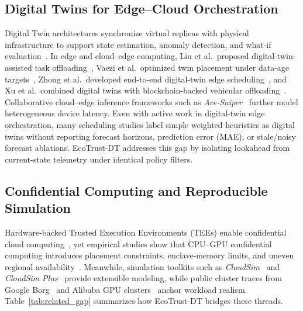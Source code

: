 \documentclass[conference]{IEEEtran}
\begin{document}
\subsection{Digital Twins for Edge--Cloud Orchestration}
Digital Twin architectures synchronize virtual replicas with physical infrastructure to support state estimation, anomaly detection, and what-if evaluation~\cite{tao2019dt,fuller2020dt,kritzinger2018dt}. In edge and cloud--edge computing, Liu et al.\ proposed digital-twin-assisted task offloading~\cite{liu2022dt}, Vaezi et al.\ optimized twin placement under data-age targets~\cite{vaezi2023dt}, Zhong et al.\ developed end-to-end digital-twin edge scheduling~\cite{zhong2024dt}, and Xu et al.\ combined digital twins with blockchain-backed vehicular offloading~\cite{xu2025dt}. Collaborative cloud--edge inference frameworks such as \textit{Ace-Sniper}~\cite{liu2023acesniper} further model heterogeneous device latency. Even with active work in digital-twin edge orchestration, many scheduling studies label simple weighted heuristics as digital twins without reporting forecast horizons, prediction error (MAE), or stale/noisy forecast ablations. EcoTrust-DT addresses this gap by isolating lookahead from current-state telemetry under identical policy filters.

\subsection{Confidential Computing and Reproducible Simulation}
Hardware-backed Trusted Execution Environments (TEEs) enable confidential cloud computing~\cite{mic2022hpc,russinovich2021confidential}, yet empirical studies show that CPU--GPU confidential computing introduces placement constraints, enclave-memory limits, and uneven regional availability~\cite{cloud2024tee}. Meanwhile, simulation toolkits such as \textit{CloudSim}~\cite{calheiros2011cloudsim} and \textit{CloudSim Plus}~\cite{silvafilho2017cloudsimplus} provide extensible modeling, while public cluster traces from Google Borg~\cite{verma2015borg} and Alibaba GPU clusters~\cite{siavashi2025gpu} anchor workload realism. Table~\ref{tab:related_gap} summarizes how EcoTrust-DT bridges these threads.
\end{document}
